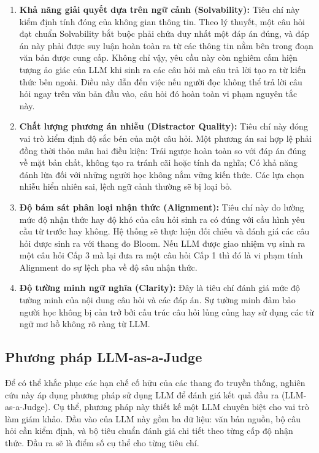 \begin{enumerate}
    \item \textbf{Khả năng giải quyết dựa trên ngữ cảnh (Solvability):} Tiêu chí này kiểm định tính đóng của không gian thông tin. Theo lý thuyết, một câu hỏi đạt chuẩn Solvability bắt buộc phải chứa duy nhất một đáp án đúng, và đáp án này phải được suy luận hoàn toàn ra từ các thông tin nằm bên trong đoạn văn bản được cung cấp. Không chỉ vậy, yêu cầu này còn nghiêm cấm hiện tượng ảo giác của LLM khi sinh ra các câu hỏi mà câu trả lời tạo ra từ kiến thức bên ngoài. Điều này dẫn đến việc nếu người đọc không thể trả lời câu hỏi ngay trên văn bản đầu vào, câu hỏi đó hoàn toàn vi phạm nguyên tắc này.

    \item \textbf{Chất lượng phương án nhiễu (Distractor Quality):} Tiêu chí này đóng vai trò kiểm định độ sắc bén của một câu hỏi. Một phương án sai hợp lệ phải đồng thời thỏa mãn hai điều kiện: Trái ngược hoàn toàn so với đáp án đúng về mặt bản chất, không tạo ra tránh cãi hoặc tính đa nghĩa; Có khả năng đánh lừa đối với những người học không nắm vững kiến thức. Các lựa chọn nhiễu hiển nhiên sai, lệch ngữ cảnh thường sẽ bị loại bỏ.

    \item \textbf{Độ bám sát phân loại nhận thức (Alignment):} Tiêu chí này đo lường mức độ nhận thức hay độ khó của câu hỏi sinh ra có đúng với cấu hình yêu cầu từ trước hay không. Hệ thống sẽ thực hiện đối chiếu và đánh giá các câu hỏi được sinh ra với thang đo Bloom. Nếu LLM được giao nhiệm vụ sinh ra một câu hỏi Cấp 3 mà lại đưa ra một câu hỏi Cấp 1 thì đó là vi phạm tính Alignment do sự lệch pha về độ sâu nhận thức.

    \item \textbf{Độ tường minh ngữ nghĩa (Clarity):} Đây là tiêu chí đánh giá mức độ tường minh của nội dung câu hỏi và các đáp án. Sự tường minh đảm bảo người học không bị cản trở bởi cấu trúc câu hỏi lủng củng hay sử dụng các từ ngữ mơ hồ không rõ ràng từ LLM.
    
\end{enumerate}

\subsection{Phương pháp LLM-as-a-Judge}

Để có thể khắc phục các hạn chế cố hữu của các thang đo truyền thống, nghiên cứu này áp dụng phương pháp sử dụng LLM để đánh giá kết quả đầu ra (LLM-as-a-Judge). Cụ thể, phương pháp này thiết kế một LLM chuyên biệt cho vai trò làm giám khảo. Đầu vào của LLM này gồm ba dữ liệu: văn bản nguồn, bộ câu hỏi cần kiểm định, và bộ tiêu chuẩn đánh giá chi tiết theo từng cấp độ nhận thức. Đầu ra sẽ là điểm số cụ thể cho từng tiêu chí.

